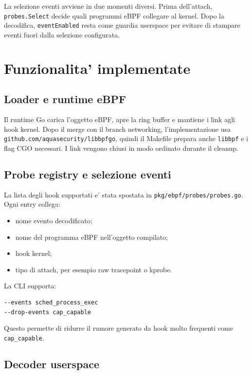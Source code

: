 \documentclass[11pt,a4paper]{article}
\begin{document}
La selezione eventi avviene in due momenti diversi. Prima dell'attach,
\texttt{probes.Select} decide quali programmi eBPF collegare al kernel. Dopo la
decodifica, \texttt{eventEnabled} resta come guardia userspace per evitare di
stampare eventi fuori dalla selezione configurata.

\section{Funzionalita' implementate}

\subsection{Loader e runtime eBPF}

Il runtime Go carica l'oggetto eBPF, apre la ring buffer e mantiene i link agli
hook kernel. Dopo il merge con il branch networking, l'implementazione usa
\texttt{github.com/aquasecurity/libbpfgo}, quindi il Makefile prepara anche
\texttt{libbpf} e i flag CGO necessari. I link vengono chiusi in modo ordinato
durante il cleanup.

\subsection{Probe registry e selezione eventi}

La lista degli hook supportati e' stata spostata in
\texttt{pkg/ebpf/probes/probes.go}. Ogni entry collega:

\begin{itemize}
  \item nome evento decodificato;
  \item nome del programma eBPF nell'oggetto compilato;
  \item hook kernel;
  \item tipo di attach, per esempio raw tracepoint o kprobe.
\end{itemize}

La CLI supporta:

\begin{lstlisting}[style=terminal]
--events sched_process_exec
--drop-events cap_capable
\end{lstlisting}

Questo permette di ridurre il rumore generato da hook molto frequenti come
\texttt{cap\_capable}.

\subsection{Decoder userspace}
\end{document}

